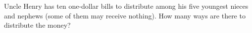 Uncle Henry has ten one-dollar bills to distribute among his five youngest nieces and nephews (some of them may receive nothing). How many ways are there to distribute the money?
